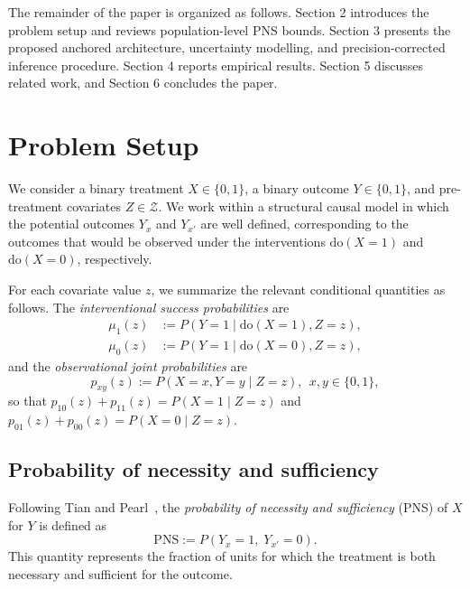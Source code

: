 \documentclass[accepted]{uai2026} %
\theoremstyle{plain}
\theoremstyle{definition}
\theoremstyle{remark}
\begin{document}
The remainder of the paper is organized as follows. Section 2 introduces the problem setup and reviews population-level PNS bounds. Section 3 presents the proposed anchored architecture, uncertainty modelling, and precision-corrected inference procedure. Section 4 reports empirical results. Section 5 discusses related work, and Section 6 concludes the paper.


\section{Problem Setup}
\label{sec:pns-setup}

We consider a binary treatment $X \in \{0,1\}$, a binary outcome
$Y \in \{0,1\}$, and pre-treatment covariates $Z \in \mathcal{Z}$.
We work within a structural causal model in which the potential
outcomes $Y_x$ and $Y_{x'}$ are well defined, corresponding to the
outcomes that would be observed under the interventions
$\mathrm{do}(X=1)$ and $\mathrm{do}(X=0)$, respectively.

For each covariate value $z$, we summarize the relevant conditional
quantities as follows. The \emph{interventional success probabilities}
are
\begin{equation}
\begin{aligned}
\mu_1(z) &:= P\!\left(Y = 1 \mid \mathrm{do}(X = 1), Z = z\right), \\
\mu_0(z) &:= P\!\left(Y = 1 \mid \mathrm{do}(X = 0), Z = z\right),
\end{aligned}
\end{equation}
and the \emph{observational joint probabilities} are
\begin{equation}
p_{xy}(z) := P(X = x, Y = y \mid Z = z), \ \  x,y \in \{0,1\},
\end{equation}
so that $p_{10}(z) + p_{11}(z) = P(X = 1 \mid Z = z)$ and
$p_{01}(z) + p_{00}(z) = P(X = 0 \mid Z = z)$.

\subsection{Probability of necessity and sufficiency}

Following Tian and Pearl~\cite{tian2000probabilities}, the
\emph{probability of necessity and sufficiency} (PNS) of $X$ for $Y$
is defined as
\begin{equation}
\mathrm{PNS}
:= P\!\left(Y_x = 1,\; Y_{x'} = 0\right).
\label{eq:pns-def}
\end{equation}
This quantity represents the fraction of units for which the treatment
is both necessary and sufficient for the outcome.
\end{document}
